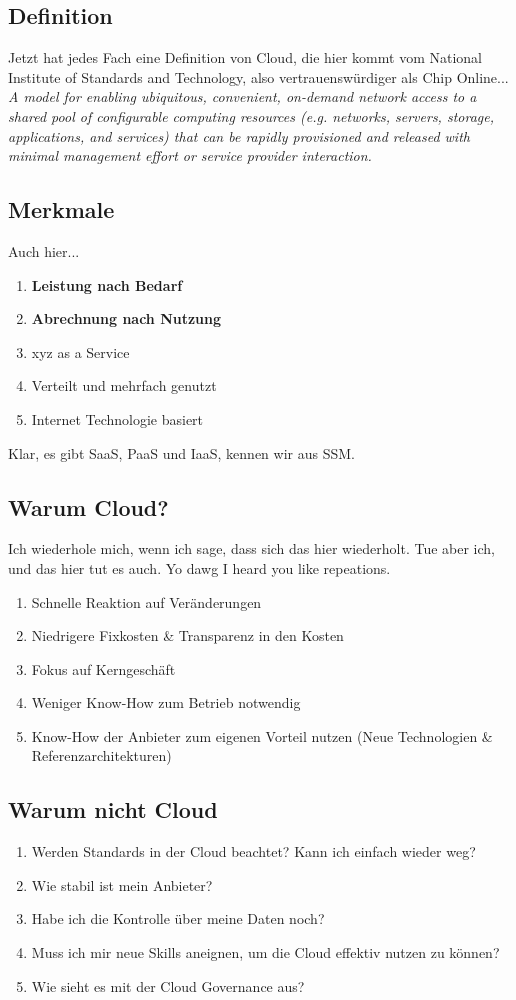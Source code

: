 \subsection{Definition}
Jetzt hat jedes Fach eine Definition von Cloud, die hier kommt vom National Institute of Standards and Technology, also  vertrauenswürdiger als Chip Online...
\textit{A model for enabling ubiquitous, convenient, on-demand network access to a shared pool of configurable computing resources (e.g. networks, servers, storage, applications, and services) that can be rapidly provisioned and released with minimal management effort or service provider interaction.}
\subsection{Merkmale}
Auch hier...
\begin{enumerate}
	\item \textbf{Leistung nach Bedarf}
	\item \textbf{Abrechnung nach Nutzung}
	\item xyz as a Service
	\item Verteilt und mehrfach genutzt
	\item Internet Technologie basiert
\end{enumerate}
Klar, es gibt SaaS, PaaS und IaaS, kennen wir aus SSM.
\subsection{Warum Cloud?}
Ich wiederhole mich, wenn ich sage, dass sich das hier wiederholt. Tue aber ich, und das hier tut es auch. Yo dawg I heard you like repeations.
\begin{enumerate}
	\item Schnelle Reaktion auf Veränderungen
	\item Niedrigere Fixkosten \& Transparenz in den Kosten
	\item Fokus auf Kerngeschäft
	\item Weniger Know-How zum Betrieb notwendig
	\item Know-How der Anbieter zum eigenen Vorteil nutzen (Neue Technologien \& Referenzarchitekturen)
\end{enumerate}
\subsection{Warum nicht Cloud}
\begin{enumerate}
	\item Werden Standards in der Cloud beachtet? Kann ich einfach wieder weg?
	\item Wie stabil ist mein Anbieter?
	\item Habe ich die Kontrolle über meine Daten noch?
	\item Muss ich mir neue Skills aneignen, um die Cloud effektiv nutzen zu können?
	\item Wie sieht es mit der Cloud Governance aus?
\end{enumerate}
